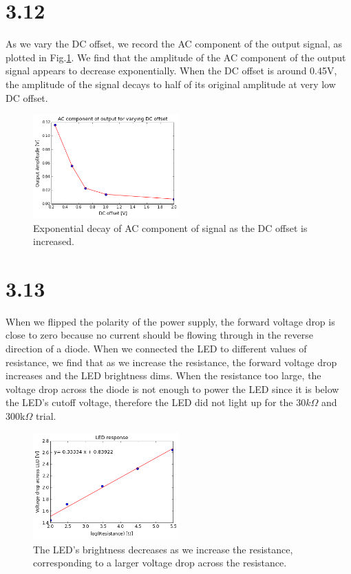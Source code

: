 \documentclass[authoryear, 12pt,5p, times]{elsarticle}
\begin{document}
\section*{3.12}
As we vary the DC offset, we record the AC component of the output signal, as plotted in Fig.\ref{3_12}. We find that the amplitude of the AC component of the output signal appears to decrease exponentially. When the DC offset is around 0.45V, the amplitude of the signal decays to half of its original amplitude at very low DC offset. 
\begin{figure}[h!]
\center
\includegraphics[width=0.5\textwidth]{figure/3_12_fig}
\caption{Exponential decay of AC component of signal as the DC offset is increased.}
\label{3_12}
\end{figure}

\section*{3.13}
When we flipped the polarity of the power supply, the forward voltage drop is close to zero because no current should be flowing through in the reverse direction of a diode. When we connected the LED to different values of resistance, we find that as we increase the resistance, the forward voltage drop increases and the LED brightness dims. When the resistance too large, the voltage drop across the diode is not enough to power the LED since it is below the LED's cutoff voltage, therefore the LED did not light up for the $30k\Omega$ and 300k$\Omega$ trial.
\begin{figure}[h!]
\center
\includegraphics[width=0.5\textwidth]{figure/3_13_LED}
\caption{The LED's brightness decreases as we increase the resistance, corresponding to a larger voltage drop across the resistance.}
\label{3_13_LED}
\end{figure}
\end{document}

